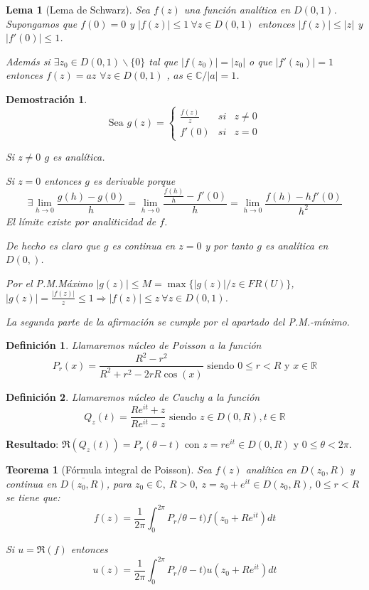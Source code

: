 \documentclass[10pt]{book}
\newtheorem{defi}{Definición}[chapter]
\newtheorem{theorem}{Teorema}[chapter]
\newtheorem*{dem}{Demostración}
\newtheorem{lema}{Lema}[chapter]
\newcommand{\R}{\mathbb{R}}
\newcommand{\C}{\mathbb{C}}
\begin{document}
\begin{lema}[Lema de Schwarz]
Sea $f(z)$ una función analítica en $D(0,1)$. Supongamos que $f(0)=0$ y $|f(z)|\leq 1\ \forall z \in D(0,1)$ entonces $|f(z)| \leq |z|$ y $|f'(0)| \leq 1$.

Además si $\exists z_0 \in D(0,1)\backslash \{0\}$ tal que $|f(z_0)| = |z_0|$ o que $|f'(z_0)| = 1$ entonces $f(z) = az$  $\forall z\in D(0,1)$ , $as \in \C/ |a|=1$.
\end{lema}

\begin{dem}
$$ \text{Sea } g(z) = \left\lbrace \begin{array}{ccc}
						\frac{f(z)}{z}& si & z\neq 0\\
						f'(0) & si & z=0\end{array}\right.$$

Si $z\neq 0$ $g$ es analítica. 

Si $z=0$ entonces $g$ es derivable porque 
$$\exists \lim_{h\to 0} \frac{g(h)-g(0)}{h} = \lim_{h\to 0} \frac{\frac{f(h)}{h}-f'(0)}{h}= \lim_{h\to 0} \frac{f(h)-hf'(0)}{h^2}$$
El límite existe por analiticidad de $f$.

De hecho es claro que $g$ es continua en $z=0$ y por tanto $g$ es analítica en $D(0,)$.

Por el P.M.Máximo $|g(z) |\leq M = \max\{|g(z)|/ z\in FR(U)\}$, $|g(z)| = \frac{|f(z)|}{z}\leq 1 \Rightarrow |f(z)| \leq z \ \forall z\in D(0,1)$.

La segunda parte de la afirmación se cumple por el apartado del P.M.-mínimo.
\end{dem}

\begin{defi}
Llamaremos núcleo de Poisson a la función 
$$P_r(x) = \frac{R^2-r^2}{R^2+r^2-2rR\cos(x)} \text{ siendo } 0\leq r < R \text{ y } x\in\R$$ 
\end{defi}

\begin{defi}
Llamaremos núcleo de Cauchy a la función 
$$Q_z(t) = \frac{Re^{it}+z}{Re^{it}-z} \text{ siendo } z\in D(0,R), t\in\R$$ 
\end{defi}
\textbf{Resultado}: $\Re(Q_z(t)) = P_r(\theta-t)$ con $z= re^{it}\in D(0,R)$ y $0\leq \theta < 2\pi$.



\begin{theorem}[Fórmula integral de Poisson]
Sea $f(z)$ analítica en $D(z_0,R)$ y continua en $\overline{D(z_0,R)}$, para $z_0\in\C,\ R>0,\ z= z_0+e^{it}\in D(z_0,R)$, $0\leq r<R$ se tiene que:
$$f(z) = \frac{1}{2\pi}\int_0^{2\pi} P_r/\theta-t)f(z_0+Re^{it})dt$$

Si $u = \Re(f)$ entonces $$u(z) = \frac{1}{2\pi}\int_0^{2\pi} P_r/\theta-t)u(z_0+Re^{it})dt$$
\end{theorem}
\end{document}
